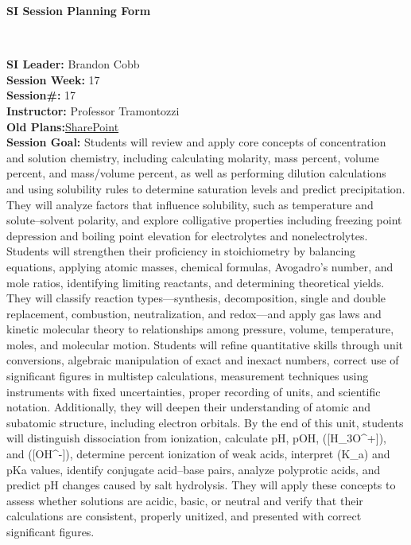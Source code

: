 \documentclass{article}
\begin{document}
\begin{center}
    {\LARGE\textbf{SI Session Planning Form}}
\end{center}

\
\noindent
\begin{flushleft}
\textbf{SI Leader:} Brandon Cobb\\
\textbf{Session Week:} 17\\
\textbf{Session\#:} 17\\
\textbf{Instructor:} Professor Tramontozzi\\
\textbf{Old Plans:}\href{https://macombedu.sharepoint.com/:b:/s/ASC-SupplementalInstructionEmbeddedTutoring/EeSYqCwT_KhMolgJvXbVEjgBOyF_DevvS8BgCm1zPkQQJg?e=QJTt4o}{SharePoint}\\
\textbf{Session Goal:} Students will review and apply core concepts of concentration and solution chemistry, including calculating molarity, mass percent, volume percent, and mass/volume percent, as well as performing dilution calculations and using solubility rules to determine saturation levels and predict precipitation. They will analyze factors that influence solubility, such as temperature and solute–solvent polarity, and explore colligative properties including freezing point depression and boiling point elevation for electrolytes and nonelectrolytes. Students will strengthen their proficiency in stoichiometry by balancing equations, applying atomic masses, chemical formulas, Avogadro’s number, and mole ratios, identifying limiting reactants, and determining theoretical yields. They will classify reaction types—synthesis, decomposition, single and double replacement, combustion, neutralization, and redox—and apply gas laws and kinetic molecular theory to relationships among pressure, volume, temperature, moles, and molecular motion. Students will refine quantitative skills through unit conversions, algebraic manipulation of exact and inexact numbers, correct use of significant figures in multistep calculations, measurement techniques using instruments with fixed uncertainties, proper recording of units, and scientific notation. Additionally, they will deepen their understanding of atomic and subatomic structure, including electron orbitals. By the end of this unit, students will distinguish dissociation from ionization, calculate pH, pOH, ([H_3O^+]), and ([OH^-]), determine percent ionization of weak acids, interpret (K_a) and pKa values, identify conjugate acid–base pairs, analyze polyprotic acids, and predict pH changes caused by salt hydrolysis. They will apply these concepts to assess whether solutions are acidic, basic, or neutral and verify that their calculations are consistent, properly unitized, and presented with correct significant figures.
\end{flushleft}
\end{document}
